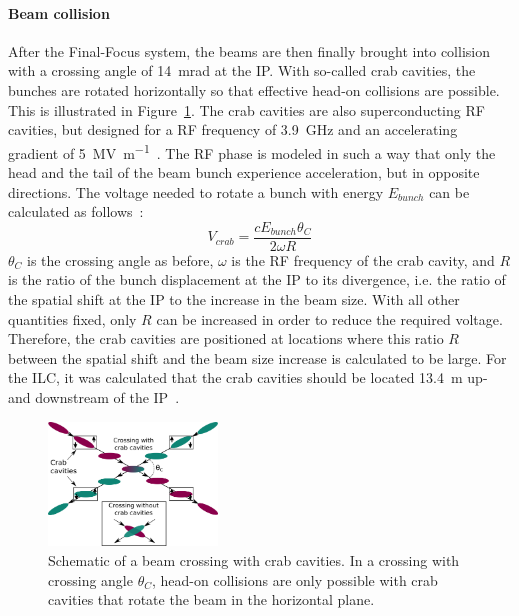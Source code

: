 \paragraph{Beam collision}
After the Final-Focus system, the beams are then finally brought into collision with a crossing angle of \SI{14}{\milli\radian} at the IP.\cite[p. 9-10]{TDR1}
With so-called crab cavities, the bunches are rotated horizontally so that effective head-on collisions are possible.
This is illustrated in Figure~\ref{fig:Crab_crossing}.
The crab cavities are also superconducting RF cavities, but designed for a RF frequency of \SI{3.9}{\giga\hertz} and an accelerating gradient of \SI{5}{\mega\volt\per\meter}~\cite[p. 154]{TDR32}.
The RF phase is modeled in such a way that only the head and the tail of the beam bunch experience acceleration, but in opposite directions.
The voltage needed to rotate a bunch with energy $E_{bunch}$ can be calculated as follows~\cite{Crab_cavities}:
\begin{equation}
 V_{crab}=\frac{cE_{bunch}\theta_C}{2\omega R}
\end{equation}
$\theta_C$ is the crossing angle as before, $\omega$ is the RF frequency of the crab cavity, and $R$ is the ratio of the bunch displacement at the IP to its divergence, i.e. the ratio of the spatial shift at the IP to the increase in the beam size.
With all other quantities fixed, only $R$ can be increased in order to reduce the required voltage.
Therefore, the crab cavities are positioned at locations where this ratio $R$ between the spatial shift and the beam size increase is calculated to be large.
For the ILC, it was calculated that the crab cavities should be located \SI{13.4}{\meter} up- and downstream of the IP~\cite[p. 154]{TDR32}.
\begin{figure}
\centering
\includegraphics[width=0.4\textwidth]{Figures/Crab_crossing.png}
\caption[Schematic of a beam crossing with crab cavities]{Schematic of a beam crossing with crab cavities. In a crossing with crossing angle $\theta_C$, head-on collisions are only possible with crab cavities that rotate the beam in the horizontal plane.}
\label{fig:Crab_crossing}
\end{figure}

